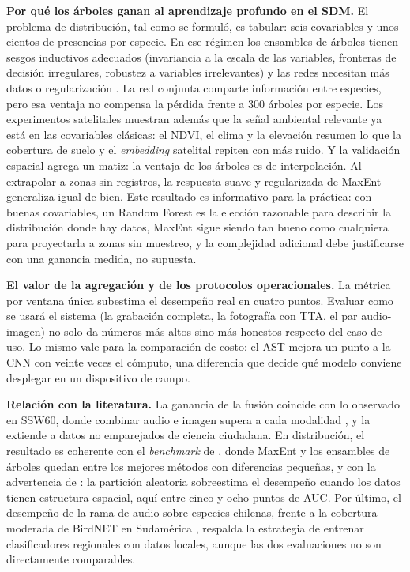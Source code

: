 \textbf{Por qué los árboles ganan al aprendizaje profundo en el SDM.} El
problema de distribución, tal como se formuló, es tabular: seis covariables
y unos cientos de presencias por especie. En ese régimen los ensambles de
árboles tienen sesgos inductivos adecuados (invariancia a la escala de las
variables, fronteras de decisión irregulares, robustez a variables
irrelevantes) y las redes necesitan más datos o regularización
\citep{grinsztajn2022trees}. La red conjunta comparte información entre
especies, pero esa ventaja no compensa la pérdida frente a 300 árboles por
especie. Los experimentos satelitales muestran además que la señal
ambiental relevante ya está en las covariables clásicas: el NDVI, el clima y
la elevación resumen lo que la cobertura de suelo y el \textit{embedding}
satelital repiten con más ruido. Y la validación espacial agrega
un matiz: la ventaja de los árboles es de interpolación. Al extrapolar a
zonas sin registros, la respuesta suave y regularizada de MaxEnt generaliza
igual de bien. Este resultado es informativo para la práctica: con buenas
covariables, un Random Forest es la elección razonable para describir la
distribución donde hay datos, MaxEnt sigue siendo tan bueno como cualquiera
para proyectarla a zonas sin muestreo, y la complejidad adicional debe
justificarse con una ganancia medida, no supuesta.

\textbf{El valor de la agregación y de los protocolos operacionales.} La
métrica por ventana única subestima el desempeño real en cuatro puntos.
Evaluar como se usará el sistema (la grabación completa, la fotografía con
TTA, el par audio-imagen) no solo da números más altos sino más honestos
respecto del caso de uso. Lo mismo vale para la comparación de costo: el AST
mejora un punto a la CNN con veinte veces el cómputo, una diferencia que
decide qué modelo conviene desplegar en un dispositivo de campo.

\textbf{Relación con la literatura.} La ganancia de la fusión coincide con lo
observado en SSW60, donde combinar audio e imagen supera a cada modalidad
\citep{vanhorn2022ssw60}, y la extiende a datos no emparejados de ciencia
ciudadana. En distribución, el resultado es coherente con el
\textit{benchmark} de \citet{valavi2022benchmark}, donde MaxEnt y los
ensambles de árboles quedan entre los mejores métodos con diferencias
pequeñas, y con la advertencia de \citet{roberts2017crossvalidation}: la
partición aleatoria sobreestima el desempeño cuando los datos tienen
estructura espacial, aquí entre cinco y ocho puntos de AUC. Por último, el
desempeño de la rama de audio sobre especies chilenas, frente a la cobertura
moderada de BirdNET en Sudamérica \citep{funosas2026birdnet}, respalda la
estrategia de entrenar clasificadores regionales con datos locales, aunque
las dos evaluaciones no son directamente comparables.


